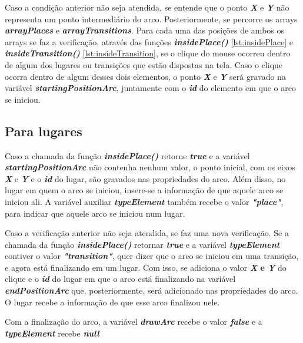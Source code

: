 \documentclass[
	12pt,				%
	openright,			%
	oneside,			%
	a4paper,			%
	english,			%
	brazil				%
	]{abntex2}
\begin{document}
Caso a condição anterior não seja atendida, se entende que o ponto \textbf{\textit{X}} e \textbf{\textit{Y}} não representa um ponto intermediário do arco. Posteriormente, se percorre os arrays \textbf{\textit{arrayPlaces}} e \textbf{\textit{arrayTransitions}}. Para cada uma das posições de ambos os arrays se faz a verificação, através das funções \textbf{\textit{insidePlace()}} \ref{lst:insidePlace} e \textbf{\textit{insideTransition()}} \ref{lst:insideTransition}, se o clique do mouse ocorreu dentro de algum dos lugares ou transições que estão dispostas na tela. Caso o clique ocorra dentro de algum desses dois elementos, o ponto \textbf{\textit{X}} e \textbf{\textit{Y}} será gravado na variável \textbf{\textit{startingPositionArc}}, juntamente com o \textbf{\textit{id}} do elemento em que o arco se iniciou. 

\subsection*{Para lugares}

Caso a chamada da função \textbf{\textit{insidePlace()}} retorne \textbf{\textit{true}} e a variável \textbf{\textit{startingPositionArc}} não contenha nenhum valor, o ponto inicial, com os eixos \textbf{\textit{X}} e \textbf{\textit{Y}} e o \textbf{\textit{id}} do lugar, são gravados nas propriedades do arco. Além disso, no lugar em quem o arco se iniciou, insere-se a informação de que aquele arco se iniciou ali. A variável auxiliar \textbf{\textit{typeElement}} também recebe o valor \textbf{\textit{"place"}}, para indicar que aquele arco se iniciou num lugar. 

Caso a verificação anterior não seja atendida, se faz uma nova verificação. Se a chamada da função \textbf{\textit{insidePlace()}} retornar \textbf{\textit{true}} e a variável \textbf{\textit{typeElement}} contiver o valor \textbf{\textit{"transition"}}, quer dizer que o arco se iniciou em uma transição, e agora está finalizando em um lugar. Com isso, se adiciona o valor \textbf{\textit{X} e \textbf{\textit{Y}}} do clique e o \textbf{\textit{id}} do lugar em que o arco está finalizando na variável \textbf{\textit{endPositionArc}} que, posteriormente, será adicionado nas propriedades do arco. O lugar recebe a informação de que esse arco finalizou nele.

Com a finalização do arco, a variável \textbf{\textit{drawArc}} recebe o valor \textbf{\textit{false}} e a \textbf{\textit{typeElement}} recebe \textbf{\textit{null}}
\end{document}
